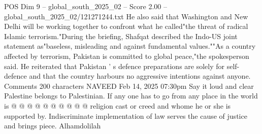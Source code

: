 \begin{textsample}{POS Dim 9 – global\_south\_2025\_02 – Score 2.00 – global\_south\_2025\_02/121271244.txt}
He also said that Washington and New Delhi will be working together to confront what he called"the threat of radical Islamic terrorism."During the briefing, Shafqat described the Indo-US joint statement as"baseless, misleading and against fundamental values.""As a country affected by terrorism, Pakistan is committed to global peace,"the spokesperson said.
He reiterated that Pakistan ' s defence preparations are solely for self-defence and that the country harbours no aggressive intentions against anyone.
Comments 200 characters NAVEED Feb 14, 2025 07:30pm Say it loud and clear Palestine belongs to Palestinian.
If any one has to go from any place in the world is @ @ @ @ @ @ @ @ @ @ religion cast or creed and whome he or she is supported by.
Indiscriminate implementation of law serves the cause of justice and brings piece.
Alhamdolilah

\end{textsample}
